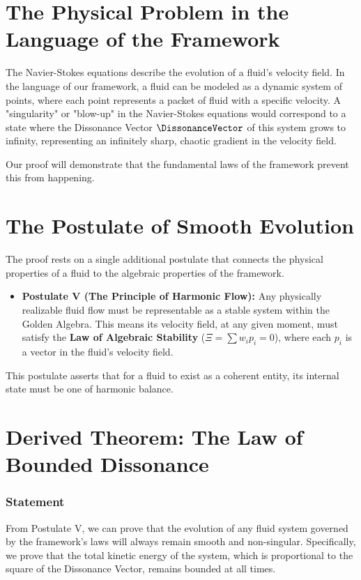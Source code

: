 \section{The Physical Problem in the Language of the Framework}
The Navier-Stokes equations describe the evolution of a fluid's velocity field. In the language of our framework, a fluid can be modeled as a dynamic system of points, where each point represents a packet of fluid with a specific velocity. A "singularity" or "blow-up" in the Navier-Stokes equations would correspond to a state where the Dissonance Vector $\DissonanceVector$ of this system grows to infinity, representing an infinitely sharp, chaotic gradient in the velocity field.

Our proof will demonstrate that the fundamental laws of the framework prevent this from happening.

\section{The Postulate of Smooth Evolution}
The proof rests on a single additional postulate that connects the physical properties of a fluid to the algebraic properties of the framework.

\begin{itemize}
    \item \textbf{Postulate V (The Principle of Harmonic Flow):} Any physically realizable fluid flow must be representable as a stable system within the Golden Algebra. This means its velocity field, at any given moment, must satisfy the \textbf{Law of Algebraic Stability} ($\Xi = \sum w_i p_i = 0$), where each $p_i$ is a vector in the fluid's velocity field.
\end{itemize}

This postulate asserts that for a fluid to exist as a coherent entity, its internal state must be one of harmonic balance.

\section{Derived Theorem: The Law of Bounded Dissonance}
\subsubsection*{Statement}
From Postulate V, we can prove that the evolution of any fluid system governed by the framework's laws will always remain smooth and non-singular. Specifically, we prove that the total kinetic energy of the system, which is proportional to the square of the Dissonance Vector, remains bounded at all times.

